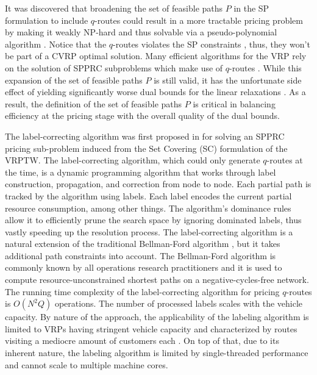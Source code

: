 It was discovered that broadening the set of feasible paths $P$
in the SP formulation to include $q$-routes could result
in a more tractable pricing problem
by making it weakly NP-hard
and thus solvable via a pseudo-polynomial algorithm \parencite{desrochers1988, irnich2005}.
Notice that the $q$-routes violates the SP constraints
,
thus, they won't be part of a CVRP optimal solution.
Many efficient algorithms for the VRP
rely on the solution of SPPRC subproblems which
make use of $q$-routes  \parencite{desrochers1992, fukasawa2006, contardo2011}.
While this expansion of the set of feasible paths $P$ is still valid,
it has the unfortunate side effect of yielding significantly
worse dual bounds for the linear relaxations \parencite{feillet2004}.
As a result,
the definition of the set of feasible paths $P$
is critical in balancing efficiency at the pricing stage
with the overall quality of the dual bounds.

The label-correcting algorithm was first proposed in \textcite{desrochers1992}
for solving an SPPRC pricing sub-problem induced from the Set Covering (SC) formulation of the VRPTW.
The label-correcting algorithm,
which could only generate $q$-routes at the time,
is a dynamic programming algorithm that works through
label construction, propagation, and correction from node to node.
Each partial path is tracked by the algorithm using labels.
Each label encodes the current partial resource consumption, among other things.
The algorithm’s dominance rules allow it to efficiently prune the search space
by ignoring dominated labels, thus vastly speeding up the resolution process.
The label-correcting algorithm is a natural extension of
the traditional Bellman-Ford algorithm \parencite{bellman1958, fordjr1956},
but it takes additional path constraints into account.
The Bellman-Ford algorithm is commonly known
by all operations research practitioners
and it is used to compute resource-unconstrained shortest paths
on a negative-cycles-free network.
The running time complexity of the label-correcting algorithm
for pricing $q$-routes is $O(N^2 Q)$ operations.
The number of processed labels scales with the vehicle capacity.
By nature of the approach,
the applicability of the labeling algorithm is limited to VRPs having stringent vehicle capacity
and characterized by routes visiting a mediocre amount of customers each \parencite{jepsen2008branchandcut}.
On top of that, due to its inherent nature,
the labeling algorithm is limited by single-threaded performance
and cannot scale to multiple machine cores.

